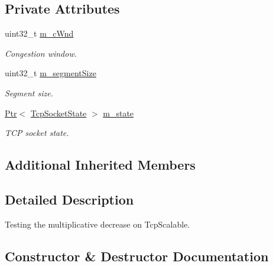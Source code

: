 \subsection*{Private Attributes}
\begin{DoxyCompactItemize}
\item 
uint32\+\_\+t \hyperlink{classTcpScalableDecrementTest_aa18d287ac42c4ab0621a19eaf5bc6a5d}{m\+\_\+c\+Wnd}
\begin{DoxyCompactList}\small\item\em Congestion window. \end{DoxyCompactList}\item 
uint32\+\_\+t \hyperlink{classTcpScalableDecrementTest_a12ef20778091715637bbd243248fcf93}{m\+\_\+segment\+Size}
\begin{DoxyCompactList}\small\item\em Segment size. \end{DoxyCompactList}\item 
\hyperlink{classns3_1_1Ptr}{Ptr}$<$ \hyperlink{classns3_1_1TcpSocketState}{Tcp\+Socket\+State} $>$ \hyperlink{classTcpScalableDecrementTest_a48e6388606dba30357673eab458bea25}{m\+\_\+state}
\begin{DoxyCompactList}\small\item\em T\+CP socket state. \end{DoxyCompactList}\end{DoxyCompactItemize}
\subsection*{Additional Inherited Members}


\subsection{Detailed Description}
Testing the multiplicative decrease on Tcp\+Scalable. 

\subsection{Constructor \& Destructor Documentation}
